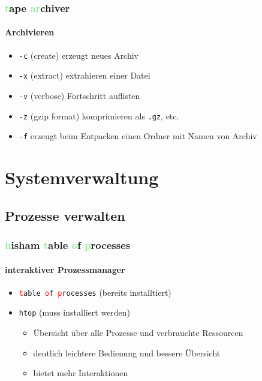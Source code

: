 \documentclass[12pt,utf8]{beamer}
\begin{document}
\begin{frame}
\frametitle{\textcolor{lightGreen}{t}ape \textcolor{lightGreen}{ar}chiver}
\framesubtitle{Archivieren}
	\begin{itemize}[<+->]
		\item {\scriptsize \texttt{-c} (create) erzeugt neues Archiv}
		\item {\scriptsize \texttt{-x} (extract) extrahieren einer Datei}
		\item {\scriptsize \texttt{-v} (verbose) Fortschritt auflisten}
		\item {\scriptsize \texttt{-z} (gzip format) komprimieren als \texttt{.gz}, etc.}
		\item {\scriptsize \texttt{-f} erzeugt beim Entpacken einen Ordner mit Namen von Archiv}
	\end{itemize}
\end{frame}

\section{Systemverwaltung}
\subsection{Prozesse verwalten}
\begin{frame}
\frametitle{\textcolor{lightGreen}{h}isham \textcolor{lightGreen}{t}able \textcolor{lightGreen}{o}f \textcolor{lightGreen}{p}rocesses}
\framesubtitle{interaktiver Prozessmanager}
\begin{itemize}
	\item \texttt{\textcolor{red}{t}able \textcolor{red}{o}f \textcolor{red}{p}rocesses} (bereits installtiert)
	\item \texttt{htop} (muss installiert werden)
	\begin{itemize}[<+->]
		\item {\scriptsize Übersicht über alle Prozesse und verbrauchte Ressourcen}
		\item {\scriptsize deutlich leichtere Bedienung und bessere Übersicht}
		\item {\scriptsize bietet mehr Interaktionen}
	\end{itemize}
\end{itemize}
\end{frame}

\begin{frame}
	\Huge\centering{\&}
\end{frame}
\end{document}
